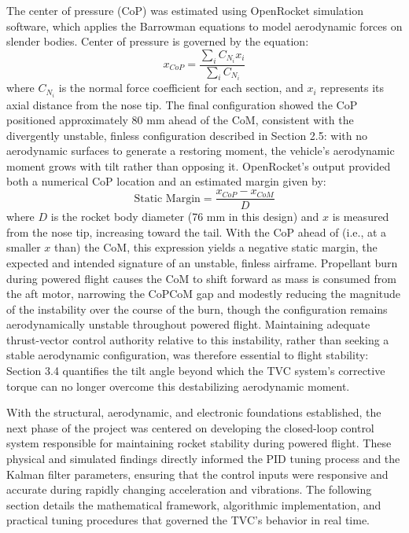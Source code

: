 The center of pressure (CoP) was estimated using OpenRocket \cite{openrocket2023} simulation software, which applies the Barrowman equations \cite{barrowman1967} to model aerodynamic forces on slender bodies. Center of pressure is governed by the equation:
\[
x_{CoP} = \frac{\sum_i C_{N_i} x_i}{\sum_i C_{N_i}}
\]
where $C_{N_i}$ is the normal force coefficient for each section, and $x_i$ represents its axial distance from the nose tip. The final configuration showed the CoP positioned approximately 80 mm ahead of the CoM, consistent with the divergently unstable, finless configuration described in Section 2.5: with no aerodynamic surfaces to generate a restoring moment, the vehicle's aerodynamic moment grows with tilt rather than opposing it. OpenRocket's output provided both a numerical CoP location and an estimated margin given by:
\[
\text{Static Margin} = \frac{x_{CoP} - x_{CoM}}{D}
\]
where $D$ is the rocket body diameter (76 mm in this design) and $x$ is measured from the nose tip, increasing toward the tail. With the CoP ahead of (i.e., at a smaller $x$ than) the CoM, this expression yields a negative static margin, the expected and intended signature of an unstable, finless airframe. Propellant burn during powered flight causes the CoM to shift forward as mass is consumed from the aft motor, narrowing the CoP\textendash CoM gap and modestly reducing the magnitude of the instability over the course of the burn, though the configuration remains aerodynamically unstable throughout powered flight. Maintaining adequate thrust-vector control authority relative to this instability, rather than seeking a stable aerodynamic configuration, was therefore essential to flight stability: Section 3.4 quantifies the tilt angle beyond which the TVC system's corrective torque can no longer overcome this destabilizing aerodynamic moment.

With the structural, aerodynamic, and electronic foundations established, the next phase of the project was centered on developing the closed-loop control system responsible for maintaining rocket stability during powered flight. These physical and simulated findings directly informed the PID tuning process and the Kalman filter parameters, ensuring that the control inputs were responsive and accurate during rapidly changing acceleration and vibrations. The following section details the mathematical framework, algorithmic implementation, and practical tuning procedures that governed the TVC’s behavior in real time.



